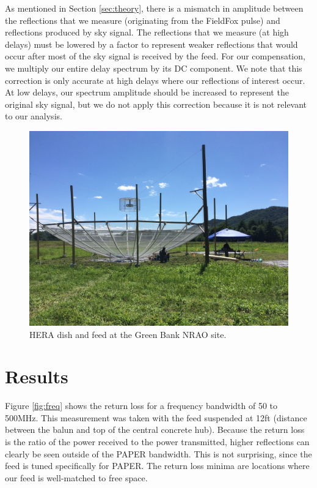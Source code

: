 \documentclass[12pt,preprint]{aastex}
\begin{document}
As mentioned in Section \ref{sec:theory}, there is a mismatch in amplitude between the reflections that we measure (originating from the FieldFox pulse) and reflections produced by sky signal. The reflections that we measure (at high delays) must be lowered by a factor to represent weaker reflections that would occur after most of the sky signal is received by the feed. For our compensation, we multiply our entire delay spectrum by its DC component. We note that this correction is only accurate at high delays where our reflections of interest occur. At low delays, our spectrum amplitude should be increased to represent the original sky signal, but we do not apply this correction because it is not relevant to our analysis.

\begin{figure}
\centering
\includegraphics[trim={2cm 20cm 30cm 15cm},clip, totalheight=0.3\textheight]{plots/heradish.jpg}
\caption{HERA dish and feed at the Green Bank NRAO site.}
\label{fig:heradish}
\end{figure}

\section{Results}

Figure \ref{fig:freq} shows the return loss for a frequency bandwidth of 50 to 500MHz. This measurement was taken with the feed suspended at 12ft (distance between the balun and top of the central concrete hub). Because the return loss is the ratio of the power received to the power transmitted, higher reflections can clearly be seen outside of the PAPER bandwidth. This is not surprising, since the feed is tuned specifically for PAPER. The return loss minima are locations where our feed is well-matched to free space.
\end{document}
